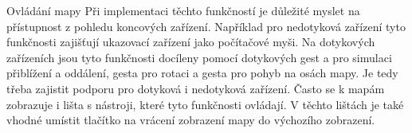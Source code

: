 \begin{subsection}{Ovládání mapy}
    Při implementaci těchto funkčností je důležité myslet na přístupnost z pohledu koncových zařízení.
    Například pro nedotyková zařízení tyto funkčnosti zajišťují ukazovací zařízení jako počítačové myši.
    Na dotykových zařízeních jsou tyto funkčnosti docíleny pomocí dotykových gest  a  pro simulaci přiblížení a oddálení, gesta  pro rotaci a gesta  pro pohyb na osách mapy.
    Je tedy třeba zajistit podporu pro dotyková i nedotyková zařízení.
    Často se k mapám zobrazuje i lišta s nástroji, které tyto funkčnosti ovládají.
    V těchto lištách je také vhodné umístit tlačítko na vrácení zobrazení mapy do výchozího zobrazení.
\end{subsection}

